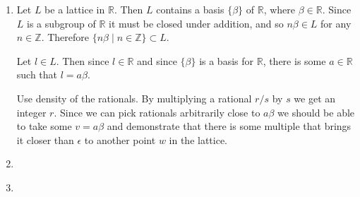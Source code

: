 \documentclass{article}
\begin{document}
\begin{Answer}
  \begin{enumerate}
    \item{

      Let $L$ be a lattice in $\mathbb{R}$. Then $L$ contains a basis
      $\{ \beta \}$ of $\mathbb{R}$, where $\beta \in
      \mathbb{R}$. Since $L$ is a subgroup of $\mathbb{R}$ it must be
      closed under addition, and so $n \beta \in L$ for any $n \in \mathbb{Z}$.
      Therefore $\{ n \beta \mid n \in \mathbb{Z} \} \subset L$.

      Let $l \in L$. Then since $l \in \mathbb{R}$ and since
      $\{ \beta \}$ is a basis for $\mathbb{R}$, there is some
      $a \in \mathbb{R}$ such that $l = a \beta$.

      Use density of the rationals. By multiplying a rational $r / s$
      by $s$ we get an integer $r$. Since we can pick rationals
      arbitrarily close to $a \beta$ we should be able to take some
      $v = a \beta$ and demonstrate that there is some multiple that
      brings it closer than $\epsilon$ to another point $w$ in the lattice.


    }
    \item{
    }
    \item{
    }
  \end{enumerate}
\end{Answer}
\end{document}
